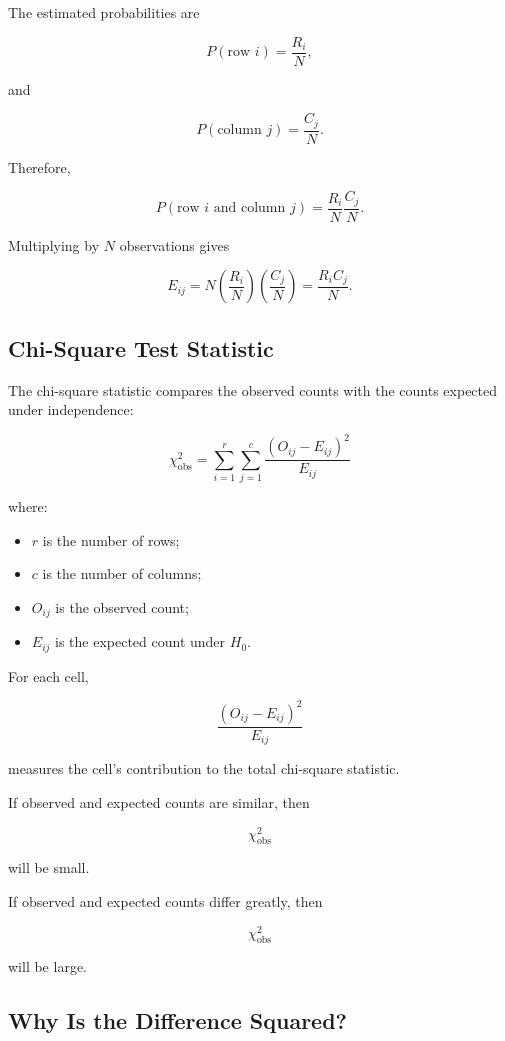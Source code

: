 \documentclass[11pt]{article}
\begin{document}
The estimated probabilities are

\[
P(\text{row }i)=\frac{R_i}{N},
\]

and

\[
P(\text{column }j)=\frac{C_j}{N}.
\]

Therefore,

\[
P(\text{row }i\text{ and column }j)
=
\frac{R_i}{N}\frac{C_j}{N}.
\]

Multiplying by \(N\) observations gives

\[
E_{ij}
=
N\left(\frac{R_i}{N}\right)
\left(\frac{C_j}{N}\right)
=
\frac{R_iC_j}{N}.
\]

\subsection{Chi-Square Test Statistic}

The chi-square statistic compares the observed counts with the counts
expected under independence:

\[
\boxed{
\chi^2_{\mathrm{obs}}
=
\sum_{i=1}^{r}
\sum_{j=1}^{c}
\frac{(O_{ij}-E_{ij})^2}{E_{ij}}
}
\]

where:

\begin{itemize}[noitemsep]
    \item \(r\) is the number of rows;
    \item \(c\) is the number of columns;
    \item \(O_{ij}\) is the observed count;
    \item \(E_{ij}\) is the expected count under \(H_0\).
\end{itemize}

For each cell,

\[
\frac{(O_{ij}-E_{ij})^2}{E_{ij}}
\]

measures the cell's contribution to the total chi-square statistic.

If observed and expected counts are similar, then

\[
\chi^2_{\mathrm{obs}}
\]

will be small.

If observed and expected counts differ greatly, then

\[
\chi^2_{\mathrm{obs}}
\]

will be large.

\subsection{Why Is the Difference Squared?}
\end{document}
